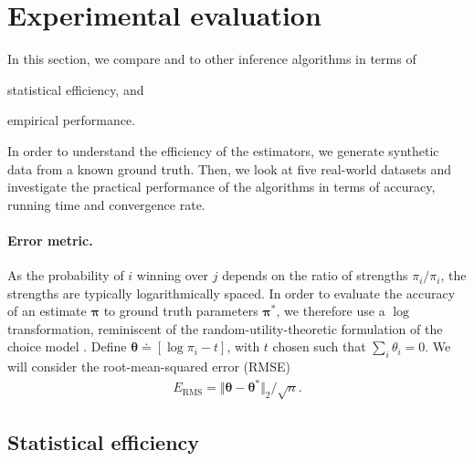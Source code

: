 \section{Experimental evaluation}
\label{sec:experimental}

In this section, we compare \LSR{} and \ILSR{} to other inference algorithms in terms of
\begin{enuminline}
\item statistical efficiency, and
\item empirical performance.
\end{enuminline}
In order to understand the efficiency of the estimators, we generate synthetic data from a known ground truth.
Then, we look at five real-world datasets and investigate the practical performance of the algorithms in terms of accuracy, running time and convergence rate.

\paragraph{Error metric.}
As the probability of $i$ winning over $j$ depends on the ratio of strengths $\pi_i / \pi_i$, the strengths are typically logarithmically spaced.
In order to evaluate the accuracy of an estimate $\bm{\pi}$ to ground truth parameters $\bm{\pi}^*$, we therefore use a $\log$ transformation, reminiscent of the random-utility-theoretic formulation of the choice model \citep{mcfadden1973conditional,hajek2014minimax}.
Define $\bm{\theta} \doteq[\log \pi_i - t]$, with $t$ chosen such that $\sum_i \theta_i = 0$.
We will consider the root-mean-squared error (RMSE)
\begin{align*}
E_{\text{RMS}} = \Vert \bm{\theta} - \bm{\theta}^* \Vert_2 / \sqrt{n}.
\end{align*}

\subsection{Statistical efficiency}


